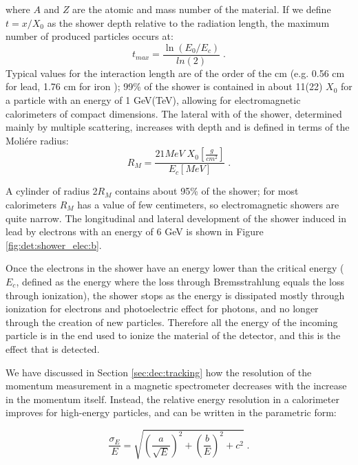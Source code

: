 \noindent where $A$ and $Z$ are the atomic and mass number of the material. If we define $t = x/X_0$ as the shower depth relative to the radiation length, the maximum number of produced particles occurs at:
\begin{equation}
t_{max} = \frac{\ln\left(E_0/E_c\right)}{ln\left(2\right)} \;. \nonumber
\end{equation}
Typical values for the interaction length are of the order of the cm (e.g. 0.56 cm for lead, 1.76 cm for iron \cite{Patrignani:2016xqp}); 99\% of the shower is contained in about 11(22) $X_0$ for a particle with an energy of 1 GeV(TeV), 
allowing for electromagnetic calorimeters of compact dimensions. 
The lateral with of the shower, determined mainly by multiple scattering, increases with depth and is defined in terms of the Moli\'ere radius:
\begin{equation}
R_M = \frac{21 MeV \; X_0[\frac{g}{cm^2}]}{E_c [MeV]} \; . \nonumber
\end{equation}

\noindent A cylinder of radius 2$R_M$ contains about 95\% of the shower; for most calorimeters $R_M$ has a value of few centimeters, so electromagnetic showers are quite narrow. The longitudinal and lateral development of the shower induced in lead by electrons with an energy of 6 GeV is shown in Figure \ref{fig:det:shower_elec:b}.

Once the electrons in the shower have an energy lower than the critical energy 
($E_c$, defined as the energy where the loss through Bremsstrahlung equals the loss through ionization), 
the shower stops as the energy is dissipated mostly through ionization for electrons and photoelectric effect for photons, 
and no longer through the creation of new particles. 
Therefore all the energy of the incoming particle is in the end used to ionize the material of the detector, and this is the effect that is detected.


We have discussed in Section \ref{sec:dec:tracking} how the resolution of the momentum measurement in a magnetic spectrometer decreases with the increase in the momentum itself. Instead, the relative energy resolution in a calorimeter improves for high-energy particles, and can be written in the parametric form:

\begin{equation}
\frac{\sigma_E}{E} = \sqrt{\left(\frac{a}{\sqrt{E}} \right)^2 + \left( \frac{b}{E} \right)^2 + c^2 } \; . \nonumber
\end{equation}

